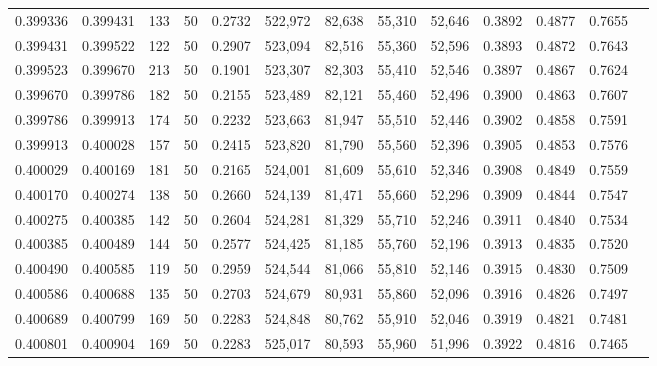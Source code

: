 \begin{tabular}{rrrrrrrrrrrrr}
0.399336 & 0.399431 &   133 &  50 &                                     0.2732 & 522,972 &  82,638 &  55,310 &  52,646 & 0.3892 & 0.4877 & 0.7655 \\
0.399431 & 0.399522 &   122 &  50 &                                     0.2907 & 523,094 &  82,516 &  55,360 &  52,596 & 0.3893 & 0.4872 & 0.7643 \\
0.399523 & 0.399670 &   213 &  50 &                                     0.1901 & 523,307 &  82,303 &  55,410 &  52,546 & 0.3897 & 0.4867 & 0.7624 \\
0.399670 & 0.399786 &   182 &  50 &                                     0.2155 & 523,489 &  82,121 &  55,460 &  52,496 & 0.3900 & 0.4863 & 0.7607 \\
0.399786 & 0.399913 &   174 &  50 &                                     0.2232 & 523,663 &  81,947 &  55,510 &  52,446 & 0.3902 & 0.4858 & 0.7591 \\
0.399913 & 0.400028 &   157 &  50 &                                     0.2415 & 523,820 &  81,790 &  55,560 &  52,396 & 0.3905 & 0.4853 & 0.7576 \\
0.400029 & 0.400169 &   181 &  50 &                                     0.2165 & 524,001 &  81,609 &  55,610 &  52,346 & 0.3908 & 0.4849 & 0.7559 \\
0.400170 & 0.400274 &   138 &  50 &                                     0.2660 & 524,139 &  81,471 &  55,660 &  52,296 & 0.3909 & 0.4844 & 0.7547 \\
0.400275 & 0.400385 &   142 &  50 &                                     0.2604 & 524,281 &  81,329 &  55,710 &  52,246 & 0.3911 & 0.4840 & 0.7534 \\
0.400385 & 0.400489 &   144 &  50 &                                     0.2577 & 524,425 &  81,185 &  55,760 &  52,196 & 0.3913 & 0.4835 & 0.7520 \\
0.400490 & 0.400585 &   119 &  50 &                                     0.2959 & 524,544 &  81,066 &  55,810 &  52,146 & 0.3915 & 0.4830 & 0.7509 \\
0.400586 & 0.400688 &   135 &  50 &                                     0.2703 & 524,679 &  80,931 &  55,860 &  52,096 & 0.3916 & 0.4826 & 0.7497 \\
0.400689 & 0.400799 &   169 &  50 &                                     0.2283 & 524,848 &  80,762 &  55,910 &  52,046 & 0.3919 & 0.4821 & 0.7481 \\
0.400801 & 0.400904 &   169 &  50 &                                     0.2283 & 525,017 &  80,593 &  55,960 &  51,996 & 0.3922 & 0.4816 & 0.7465 \\

\end{tabular}
